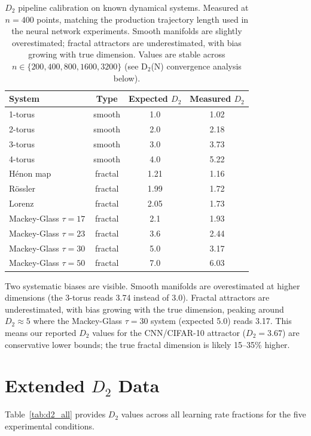 \documentclass[aps,prl,twocolumn,superscriptaddress,floatfix]{revtex4-2}
\begin{document}
\begin{table}[h]
\caption{\label{tab:calibration}%
$D_2$ pipeline calibration on known dynamical systems. Measured at $n=400$ points, matching the production trajectory length used in the neural network experiments. Smooth manifolds are slightly overestimated; fractal attractors are underestimated, with bias growing with true dimension. Values are stable across $n \in \{200, 400, 800, 1600, 3200\}$ (see D$_2$(N) convergence analysis below).}
\begin{ruledtabular}
\begin{tabular}{lccc}
System & Type & Expected $D_2$ & Measured $D_2$\\
\hline
1-torus & smooth & 1.0 & 1.02\\
2-torus & smooth & 2.0 & 2.18\\
3-torus & smooth & 3.0 & 3.73\\
4-torus & smooth & 4.0 & 5.22\\
H\'{e}non map & fractal & 1.21 & 1.16\\
R\"{o}ssler & fractal & 1.99 & 1.72\\
Lorenz & fractal & 2.05 & 1.73\\
Mackey-Glass $\tau{=}17$ & fractal & 2.1 & 1.93\\
Mackey-Glass $\tau{=}23$ & fractal & 3.6 & 2.44\\
Mackey-Glass $\tau{=}30$ & fractal & 5.0 & 3.17\\
Mackey-Glass $\tau{=}50$ & fractal & 7.0 & 6.03\\
\end{tabular}
\end{ruledtabular}
\end{table}

Two systematic biases are visible. Smooth manifolds are overestimated at higher dimensions (the 3-torus reads 3.74 instead of 3.0). Fractal attractors are underestimated, with bias growing with the true dimension, peaking around $D_2 \approx 5$ where the Mackey-Glass $\tau{=}30$ system (expected 5.0) reads 3.17. This means our reported $D_2$ values for the CNN/CIFAR-10 attractor ($D_2 = 3.67$) are conservative lower bounds; the true fractal dimension is likely 15--35\% higher.

\section{Extended $D_2$ Data}

Table~\ref{tab:d2_all} provides $D_2$ values across all learning rate fractions for the five experimental conditions.
\end{document}
